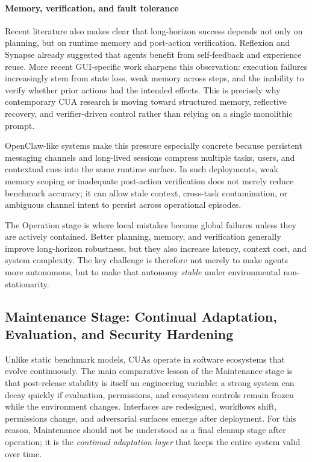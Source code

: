 \paragraph{Memory, verification, and fault tolerance}
Recent literature also makes clear that long-horizon success depends not only on planning, but on runtime memory and post-action verification. Reflexion \cite{shinn2023reflexion} and Synapse \cite{zheng2023synapse} already suggested that agents benefit from self-feedback and experience reuse. More recent GUI-specific work sharpens this observation: execution failures increasingly stem from state loss, weak memory across steps, and the inability to verify whether prior actions had the intended effects. This is precisely why contemporary CUA research is moving toward structured memory, reflective recovery, and verifier-driven control rather than relying on a single monolithic prompt.

OpenClaw-like systems make this pressure especially concrete because persistent messaging channels and long-lived sessions compress multiple tasks, users, and contextual cues into the same runtime surface. In such deployments, weak memory scoping or inadequate post-action verification does not merely reduce benchmark accuracy; it can allow stale context, cross-task contamination, or ambiguous channel intent to persist across operational episodes.

The Operation stage is where local mistakes become global failures unless they are actively contained. Better planning, memory, and verification generally improve long-horizon robustness, but they also increase latency, context cost, and system complexity. The key challenge is therefore not merely to make agents more autonomous, but to make that autonomy \emph{stable} under environmental non-stationarity.

\subsection{Maintenance Stage: Continual Adaptation, Evaluation, and Security Hardening}
\label{sec:maintenance}

Unlike static benchmark models, CUAs operate in software ecosystems that evolve continuously. The main comparative lesson of the Maintenance stage is that post-release stability is itself an engineering variable: a strong system can decay quickly if evaluation, permissions, and ecosystem controls remain frozen while the environment changes. Interfaces are redesigned, workflows shift, permissions change, and adversarial surfaces emerge after deployment. For this reason, Maintenance should not be understood as a final cleanup stage after operation; it is the \emph{continual adaptation layer} that keeps the entire system valid over time.

